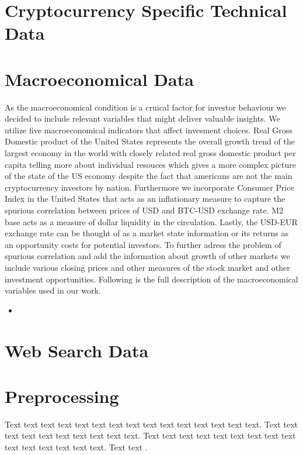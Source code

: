 \section{Cryptocurrency Specific Technical Data}




\section{Macroeconomical Data}

As the macroeconomical condition is a cruical factor for investor behaviour 
we decided to include relevant variables that might deliver valuable
insights. We utilize five macroeconomical indicators that affect invesment choices.
Real Gross Domestic product of the United States represents the overall
growth trend of the largest economy in the world with closely related real
gross domestic product per capita telling more about individual resouces which
gives a more complex picture of the state of the US economy despite the 
fact that americans are not the main cryptocurrency investors by nation.
Furthermore we incorporate Consumer Price Index in the United States that
acts as an inflationary measure to capture the spurious correlation between 
prices of USD and BTC-USD exchange rate. M2 base acts as a measure
of dollar liquidity in the circulation. Lastly, the USD-EUR exchange rate
can be thought of as a market state information or its returns as an 
opportunity costs for potential investors. To further adress the problem of spurious
correlation and add the information about growth of other markets we include
various closing prices and other measures of the stock market and other 
investment opportunities. Following is the full description of the macroeconomical
variables used in our work.

\begin{itemize} 
    \item 
\end{itemize}
\section{Web Search Data}

\section{Preprocessing}






Text text text text text text text text text text text text text text text. Text text text text text text text text text text. Text text text text text text text text text text text text text text text. Text text  \citet{Haufler2006}.

